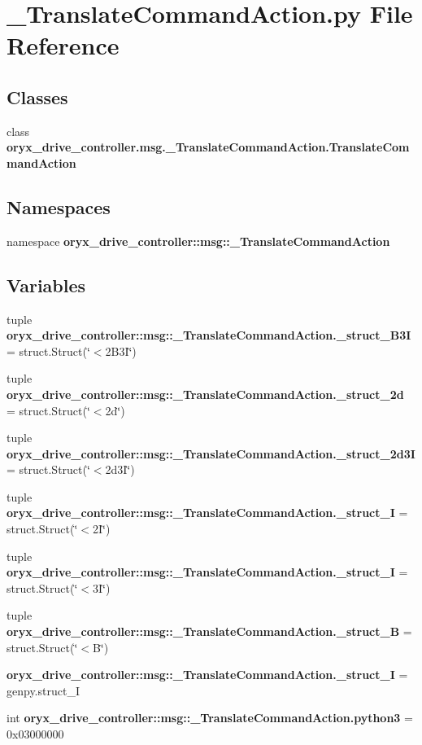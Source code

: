 \section{\-\_\-\-Translate\-Command\-Action.\-py \-File \-Reference}
\label{__TranslateCommandAction_8py}
\subsection*{\-Classes}
\begin{DoxyCompactItemize}
\item 
class {\bf oryx\-\_\-drive\-\_\-controller.\-msg.\-\_\-\-Translate\-Command\-Action.\-Translate\-Command\-Action}
\end{DoxyCompactItemize}
\subsection*{\-Namespaces}
\begin{DoxyCompactItemize}
\item 
namespace {\bf oryx\-\_\-drive\-\_\-controller\-::msg\-::\-\_\-\-Translate\-Command\-Action}
\end{DoxyCompactItemize}
\subsection*{\-Variables}
\begin{DoxyCompactItemize}
\item 
tuple {\bf oryx\-\_\-drive\-\_\-controller\-::msg\-::\-\_\-\-Translate\-Command\-Action.\-\_\-struct\-\_\-B3\-I} = struct.\-Struct(\char`\"{}$<$2\-B3\-I\char`\"{})
\item 
tuple {\bf oryx\-\_\-drive\-\_\-controller\-::msg\-::\-\_\-\-Translate\-Command\-Action.\-\_\-struct\-\_\-2d} = struct.\-Struct(\char`\"{}$<$2d\char`\"{})
\item 
tuple {\bf oryx\-\_\-drive\-\_\-controller\-::msg\-::\-\_\-\-Translate\-Command\-Action.\-\_\-struct\-\_\-2d3\-I} = struct.\-Struct(\char`\"{}$<$2d3\-I\char`\"{})
\item 
tuple {\bf oryx\-\_\-drive\-\_\-controller\-::msg\-::\-\_\-\-Translate\-Command\-Action.\-\_\-struct\-\_\-I} = struct.\-Struct(\char`\"{}$<$2\-I\char`\"{})
\item 
tuple {\bf oryx\-\_\-drive\-\_\-controller\-::msg\-::\-\_\-\-Translate\-Command\-Action.\-\_\-struct\-\_\-I} = struct.\-Struct(\char`\"{}$<$3\-I\char`\"{})
\item 
tuple {\bf oryx\-\_\-drive\-\_\-controller\-::msg\-::\-\_\-\-Translate\-Command\-Action.\-\_\-struct\-\_\-\-B} = struct.\-Struct(\char`\"{}$<$\-B\char`\"{})
\item 
{\bf oryx\-\_\-drive\-\_\-controller\-::msg\-::\-\_\-\-Translate\-Command\-Action.\-\_\-struct\-\_\-\-I} = genpy.\-struct\-\_\-\-I
\item 
int {\bf oryx\-\_\-drive\-\_\-controller\-::msg\-::\-\_\-\-Translate\-Command\-Action.\-python3} = 0x03000000
\end{DoxyCompactItemize}
